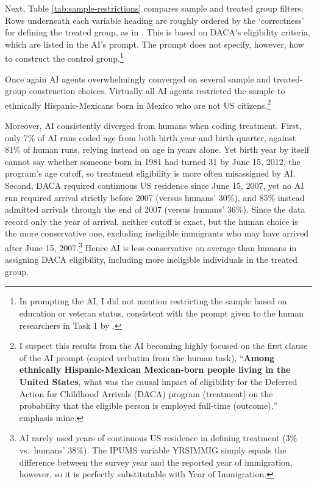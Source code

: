 \documentclass[
  12pt]{article}
\begin{document}
Next, Table \ref{tab:sample-restrictions} compares sample and treated
group filters. Rows underneath each variable heading are roughly ordered
by the `correctness' for defining the treated group, as in
\citet{huntingtonklein2025sources}. This is based on DACA's eligibility
criteria, which are listed in the AI's prompt. The prompt does not
specify, however, how to construct the control
group.\footnote{In prompting the AI, I did not mention restricting the sample based on education or veteran status, consistent with the prompt given to the human researchers in Task 1 by \citet{huntingtonklein2025sources}.}

\begin{table}[H]
\centering
\caption{Sample and treated-group restriction choices by researcher type}
\label{tab:sample-restrictions}
\tiny
\setlength{\tabcolsep}{1.4pt}
\renewcommand{\arraystretch}{0.55}
\resizebox{\textwidth}{!}{}
\caption*{\footnotesize \textbf{Notes:} The table compares AI-agent restriction choices with the published Task 1 counts from Table 6 of \citet{huntingtonklein2025sources}. Treated-group restrictions inherit those used to restrict the whole sample.}
\end{table}
\FloatBarrier

Once again AI agents overwhelmingly converged on several sample and
treated-group construction choices. Virtually all AI agents restricted
the sample to ethnically Hispanic-Mexicans born in Mexico who are not US
citizens.\footnote{I suspect this results from the AI becoming highly focused on the first clause of the AI prompt (copied verbatim from the human task), ``\textbf{Among ethnically Hispanic-Mexican Mexican-born people living in the United States}, what was the causal impact of eligibility for the Deferred Action for Childhood Arrivals (DACA) program (treatment) on the probability that the eligible person is employed full-time (outcome),'' emphasis mine.}

Moreover, AI consistently diverged from humans when coding treatment.
First, only 7\% of AI runs coded age from both birth year and birth
quarter, against 81\% of human runs, relying instead on age in years
alone. Yet birth year by itself cannot say whether someone born in 1981
had turned 31 by June 15, 2012, the program's age cutoff, so treatment
eligibility is more often misassigned by AI. Second, DACA required
continuous US residence since June 15, 2007, yet no AI run required
arrival strictly before 2007 (versus humans' 30\%), and 85\% instead
admitted arrivals through the end of 2007 (versus humans' 36\%). Since
the data record only the year of arrival, neither cutoff is exact, but
the human choice is the more conservative one, excluding ineligible
immigrants who may have arrived after June 15, 2007.\footnote{AI rarely
  used years of continuous US residence in defining treatment (3\%
  vs.~humans' 38\%). The IPUMS variable YRSIMMIG simply equals the
  difference between the survey year and the reported year of
  immigration, however, so it is perfectly substitutable with Year of
  Immigration.} Hence AI is less conservative on average than humans in
assigning DACA eligibility, including more ineligible individuals in the
treated group.
\end{document}
